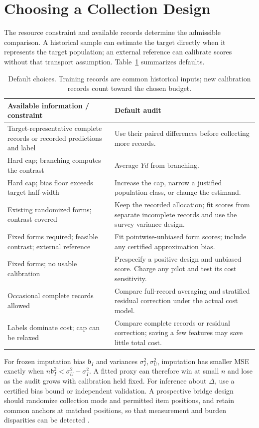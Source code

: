 \section{Choosing a Collection Design}\label{sec:guidance}
The resource constraint and available records determine the admissible comparison. A historical sample can estimate the target directly when it represents the target population; an external reference can calibrate scores without that transport assumption. Table~\ref{tab:decision} summarizes defaults.

\begin{table}[h]
\centering
\caption{Default choices. Training records are common historical inputs; new calibration records count toward the chosen budget.}
\label{tab:decision}
\small
\begin{tabular}{p{}p{}}
\toprule
Available information / constraint & Default audit \\
\midrule
Target-representative complete records or recorded predictions and label & Use their paired differences before collecting more records. \\
Hard cap; branching computes the contrast & Average $Yd$ from branching. \\
Hard cap; bias floor exceeds target half-width & Increase the cap, narrow a justified population class, or change the estimand. \\
Existing randomized forms; contrast covered & Keep the recorded allocation; fit scores from separate incomplete records and use the survey variance design. \\
Fixed forms required; feasible contrast; external reference & Fit pointwise-unbiased form scores; include any certified approximation bias. \\
Fixed forms; no usable calibration & Prespecify a positive design and unbiased score. Charge any pilot and test its cost sensitivity. \\
Occasional complete records allowed & Compare full-record averaging and stratified residual correction under the actual cost model. \\
Labels dominate cost; cap can be relaxed & Compare complete records or residual correction; saving a few features may save little total cost. \\
\bottomrule
\end{tabular}
\end{table}

For frozen imputation bias $\mathfrak b_I$ and variances $\sigma_I^2,\sigma_U^2$, imputation has smaller MSE exactly when $n\mathfrak b_I^2<\sigma_U^2-\sigma_I^2$. A fitted proxy can therefore win at small $n$ and lose as the audit grows with calibration held fixed. For inference about $\Delta$, use a certified bias bound or independent validation. A prospective bridge design should randomize collection mode and permitted item positions, and retain common anchors at matched positions, so that measurement and burden disparities can be detected \citep{schuman1981}.
